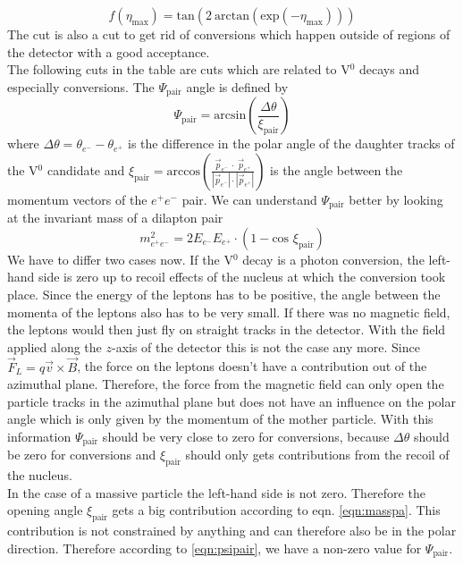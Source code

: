 \begin{equation}
\label{eqn:slope}
f \left(\eta_{\text{max}} \right) = \text{tan} \left( 2 \ \text{arctan} \left( \text{exp} \left( - \eta_{\text{max}} \right) \right) \right)
\end{equation}
The cut is also a cut to get rid of conversions which happen outside of regions of the detector with a good acceptance. \\
The following cuts in the table are cuts which are related to V$^0$ decays and especially conversions. The $\Psi_{\mathrm{pair}}$ angle is defined by 
\begin{equation}
\label{eqn:psipair}
\Psi_{\text{pair}} = \text{arcsin} \left( \frac{\Delta \theta}{\xi_{\text{pair}}} \right)
\end{equation} 
where $\Delta \theta = \theta_{e^-} - \theta_{e^+}$ is the difference in the polar angle of the daughter tracks of the V$^0$ candidate and 
$\xi_{\text{pair}} = \text{arccos} \left( \frac{\vec{p}_{e^-} \ \cdot \ \vec{p}_{e^+}}{|\vec{p}_{e^-}| \cdot |\vec{p}_{e^+}|} \right)$ 
is the angle between the momentum vectors of the $e^+e^-$ pair. We can understand $\Psi_{\mathrm{pair}}$ better by looking at the invariant mass of a dilapton pair
\begin{equation}
\label{eqn:masspa}
m_{e^+e^-}^2 = 2 E_{e^-} E_{e^+} \cdot \left( 1- \text{cos } \xi_{\text{pair}} \right)
\end{equation}
We have to differ two cases now. If the V$^0$ decay is a photon conversion, the left-hand side is zero up to recoil effects of the nucleus at which the conversion took place. Since the energy of the leptons has to be positive, the angle between the momenta of the leptons also has to be very small. If there was no magnetic field, the leptons would then just fly on straight tracks in the detector. With the field applied along the $z$-axis of the detector this is not the case any more. Since $\vec{F}_L = q \vec{v} \times \vec{B}$, the force on the leptons doesn't have a contribution out of the azimuthal plane. Therefore, the force from the magnetic field can only open the particle tracks in the azimuthal plane but does not have an influence on the polar angle which is only given by the momentum of the mother particle. With this information $\Psi_{\mathrm{pair}}$ should be very close to zero for conversions, because $\Delta\theta$ should be zero for conversions and $\xi_{\mathrm{pair}}$ should only gets contributions from the recoil of the nucleus. \\
In the case of a massive particle the left-hand side is not zero. Therefore the opening angle $\xi_{\mathrm{pair}}$ gets a big contribution according to eqn. \ref{eqn:masspa}. This contribution is not constrained by anything and can therefore also be in the polar direction. Therefore according to \ref{eqn:psipair}, we have a non-zero value for $\Psi_{\mathrm{pair}}$. \\
